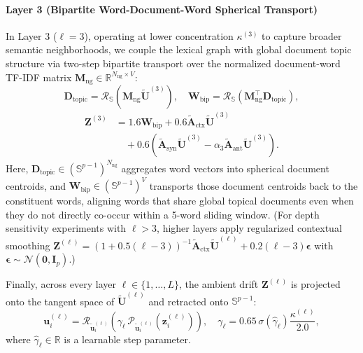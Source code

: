 \documentclass[journal]{IEEEtran}
\begin{document}
\paragraph{Layer 3 (Bipartite Word-Document-Word Spherical Transport)}
In Layer 3 ($\ell = 3$), operating at lower concentration $\kappa^{(3)}$ to capture broader semantic neighborhoods, we couple the lexical graph with global document topic structure via two-step bipartite transport over the normalized document-word TF-IDF matrix $\mathbf{M}_{\text{ng}} \in \mathbb{R}^{N_{\text{ng}} \times V}$:
\begin{equation}
\mathbf{D}_{\text{topic}} = \mathcal{R}_{\mathbb{S}}\!\left(\mathbf{M}_{\text{ng}}\tilde{\mathbf{U}}^{(3)}\right), \quad \mathbf{W}_{\text{bip}} = \mathcal{R}_{\mathbb{S}}\!\left(\mathbf{M}_{\text{ng}}^\top \mathbf{D}_{\text{topic}}\right),
\label{eq:bip_transport}
\end{equation}
\begin{equation}
\begin{aligned}
\mathbf{Z}^{(3)} &= 1.6\mathbf{W}_{\text{bip}} + 0.6\tilde{\mathbf{A}}_{\text{ctx}}\tilde{\mathbf{U}}^{(3)} \\
&\quad + 0.6\left(\tilde{\mathbf{A}}_{\text{syn}}\tilde{\mathbf{U}}^{(3)} - \alpha_3\tilde{\mathbf{A}}_{\text{ant}}\tilde{\mathbf{U}}^{(3)}\right).
\end{aligned}
\label{eq:layer3_drift}
\end{equation}
Here, $\mathbf{D}_{\text{topic}} \in (\mathbb{S}^{p-1})^{N_{\text{ng}}}$ aggregates word vectors into spherical document centroids, and $\mathbf{W}_{\text{bip}} \in (\mathbb{S}^{p-1})^V$ transports those document centroids back to the constituent words, aligning words that share global topical documents even when they do not directly co-occur within a 5-word sliding window. (For depth sensitivity experiments with $\ell > 3$, higher layers apply regularized contextual smoothing $\mathbf{Z}^{(\ell)} = (1 + 0.5(\ell - 3))^{-1}\tilde{\mathbf{A}}_{\text{ctx}}\tilde{\mathbf{U}}^{(\ell)} + 0.2(\ell - 3)\boldsymbol{\epsilon}$ with $\boldsymbol{\epsilon} \sim \mathcal{N}(\mathbf{0}, \mathbf{I}_p)$.)

Finally, across every layer $\ell \in \{1, \dots, L\}$, the ambient drift $\mathbf{Z}^{(\ell)}$ is projected onto the tangent space of $\tilde{\mathbf{U}}^{(\ell)}$ and retracted onto $\mathbb{S}^{p-1}$:
\begin{equation}
\mathbf{u}_i^{(\ell)} = \mathcal{R}_{\tilde{\mathbf{u}}_i^{(\ell)}}\!\left(\gamma_\ell \, \mathcal{P}_{\tilde{\mathbf{u}}_i^{(\ell)}}\!\left(\mathbf{z}_i^{(\ell)}\right)\right), \quad \gamma_\ell = 0.65\,\sigma(\hat{\gamma}_\ell)\frac{\kappa^{(\ell)}}{2.0},
\label{eq:layer_update}
\end{equation}
where $\hat{\gamma}_\ell \in \mathbb{R}$ is a learnable step parameter.
\end{document}
